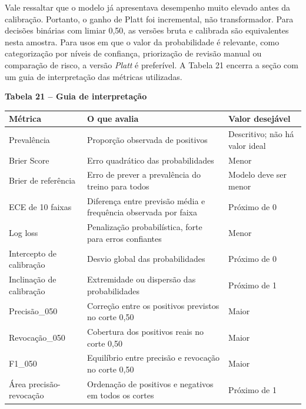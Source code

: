 Vale ressaltar que o modelo já apresentava desempenho muito elevado antes da calibração. Portanto, o ganho de Platt foi incremental, não transformador. Para decisões binárias com limiar 0,50, as versões bruta e calibrada são equivalentes nesta amostra. Para usos em que o valor da probabilidade é relevante, como categorização por níveis de confiança, priorização de revisão manual ou comparação de risco, a versão \textit{Platt} é preferível. A Tabela 21 encerra a seção com um guia de interpretação das métricas utilizadas.

\textbf{Tabela 21 -- Guia de interpretação}
\begin{longtable}[]{@{}
			>{\raggedright\arraybackslash}p{}
			>{\raggedright\arraybackslash}p{}
			>{\raggedright\arraybackslash}p{}@{}}
		\toprule\noalign{}
		\begin{minipage}[b]{\linewidth}\raggedright
			\textbf{Métrica}
		\end{minipage} & \begin{minipage}[b]{\linewidth}\raggedright
			\textbf{O que avalia}
		\end{minipage} & \begin{minipage}[b]{\linewidth}\raggedright
			\textbf{Valor desejável}
		\end{minipage} \\
		\midrule\noalign{}
		\endhead
		\bottomrule\noalign{}
		\endlastfoot
		Prevalência & Proporção observada de positivos & Descritivo; não há
		valor ideal \\
		Brier Score & Erro quadrático das probabilidades & Menor \\
		Brier de referência & Erro de prever a prevalência do treino para todos
		& Modelo deve ser menor \\
		ECE de 10 faixas & Diferença entre previsão média e frequência observada
		por faixa & Próximo de 0 \\
		Log loss & Penalização probabilística, forte para erros confiantes &
		Menor \\
		Intercepto de calibração & Desvio global das probabilidades & Próximo de
		0 \\
		Inclinação de calibração & Extremidade ou dispersão das probabilidades &
		Próximo de 1 \\
		Precisão\_050 & Correção entre os positivos previstos no corte 0,50 &
		Maior \\
		Revocação\_050 & Cobertura dos positivos reais no corte 0,50 & Maior \\
		F1\_050 & Equilíbrio entre precisão e revocação no corte 0,50 & Maior \\
		Área precisão-revocação & Ordenação de positivos e negativos em todos os
		cortes & Próximo de 1 \\
\end{longtable}

